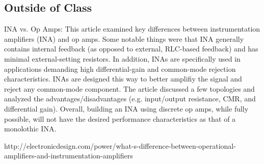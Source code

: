 \documentclass[conference]{IEEEtran}
\begin{document}
\subsection{Outside of Class}
INA vs. Op Amps\cite{IEEEhowto:kopka}: This article examined key differences between instrumentation amplifiers (INA) and op amps.  Some notable things were that INA generally contains internal feedback (as opposed to external, RLC-based feedback) and has minimal external-setting resistors.  In addition, INAs are specifically used in applications demanding high differential-gain and common-mode rejection characteristics.  INAs are designed this way to better amplifiy the signal and reject any common-mode component.  The article discussed a few topologies and analyzed the advantages/disadvantages (e.g. input/output resistance, CMR, and differential gain).  Overall, building an INA using discrete op amps, while fully possible, will not have the desired performance characteristics as that of a monolothic INA.
\begin{thebibliography}{1}
http://electronicdesign.com/power/what-s-difference-between-operational-amplifiers-and-instrumentation-amplifiers
\end{thebibliography}
\end{document}
